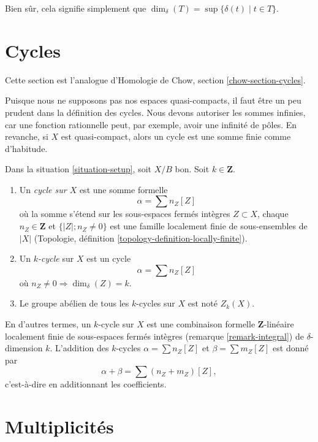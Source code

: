 \noindent
Bien sûr, cela signifie simplement que $\dim_\delta(T) = \sup \{\delta(t) \mid
t \in T\}$.







\section{Cycles}
\label{section-cycles}

\noindent
Cette section est l'analogue d'Homologie de Chow, section
\ref{chow-section-cycles}.

\medskip\noindent
Puisque nous ne supposons pas nos espaces quasi-compacts, il faut être un peu
prudent dans la définition des cycles. Nous devons autoriser les sommes infinies,
car une fonction rationnelle peut, par exemple, avoir une infinité de pôles.
En revanche, si $X$ est quasi-compact, alors un cycle est
une somme finie comme d'habitude.

\begin{definition}
\label{definition-cycles}
Dans la situation \ref{situation-setup}, soit $X/B$ bon. Soit $k
\in \mathbf{Z}$.
\begin{enumerate}
\item Un {\it cycle sur $X$} est une somme formelle
$$
\alpha = \sum n_Z [Z]
$$
où la somme s'étend sur les sous-espaces fermés intègres $Z \subset X$,
chaque $n_Z \in \mathbf{Z}$ et $\{|Z|; n_Z \not = 0\}$ est une famille
localement finie de sous-ensembles de $|X|$ (Topologie, définition
\ref{topology-definition-locally-finite}).
\item Un {\it $k$-cycle} sur $X$ est un cycle
$$
\alpha = \sum n_Z [Z]
$$
où $n_Z \not = 0 \Rightarrow \dim_\delta(Z) = k$.
\item Le groupe abélien de tous les $k$-cycles sur $X$ est noté $Z_k(X)$.
\end{enumerate}
\end{definition}

\noindent
En d'autres termes, un $k$-cycle sur $X$ est une combinaison formelle
$\mathbf{Z}$-linéaire localement finie de sous-espaces fermés intègres (remarque
\ref{remark-integral}) de $\delta$-dimension $k$. L'addition des $k$-cycles
$\alpha = \sum n_Z[Z]$ et $\beta = \sum m_Z[Z]$ est donné par
$$
\alpha + \beta = \sum (n_Z + m_Z)[Z],
$$
c'est-à-dire en additionnant les coefficients.




\section{Multiplicités}
\label{section-multiplicities}

